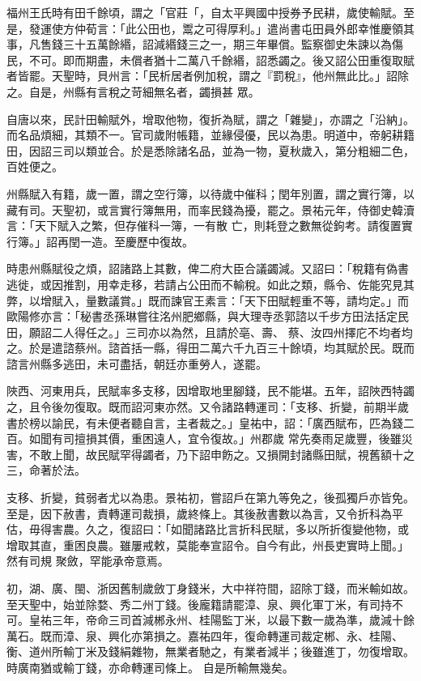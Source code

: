\begin{pinyinscope}
 福州王氏時有田千餘頃，謂之「官莊「，自太平興國中授券予民耕，歲使輸賦。至是，發運使方仲荀言：「此公田也，鬻之可得厚利。」遣尚書屯田員外郎幸惟慶領其事，凡售錢三十五萬餘緡，詔減緡錢三之一，期三年畢償。監察御史朱諫以為傷民，不可。即而期盡，未償者猶十二萬八千餘緡，詔悉蠲之。後又詔公田重復取賦者皆罷。天聖時，貝州言：「民析居者例加稅，謂之『罰稅』，他州無此比。」詔除之。自是，州縣有言稅之苛細無名者，蠲損甚
 眾。



 自唐以來，民計田輸賦外，增取他物，復折為賦，謂之「雜變」，亦謂之「沿納」。而名品煩細，其類不一。官司歲附帳籍，並緣侵優，民以為患。明道中，帝躬耕籍田，因詔三司以類並合。於是悉除諸名品，並為一物，夏秋歲入，第分粗細二色，百姓便之。



 州縣賦入有籍，歲一置，謂之空行簿，以待歲中催科；閏年別置，謂之實行簿，以藏有司。天聖初，或言實行簿無用，而率民錢為擾，罷之。景祐元年，侍御史韓瀆言：「天下賦入之繁，但存催科一簿，一有散
 亡，則耗登之數無從鉤考。請復置實行簿。」詔再閏一造。至慶歷中復故。



 時患州縣賦役之煩，詔諸路上其數，俾二府大臣合議蠲減。又詔曰：「稅籍有偽書逃徙，或因推割，用幸走移，若請占公田而不輸稅。如此之類，縣令、佐能究見其弊，以增賦入，量數議賞。」既而諫官王素言：「天下田賦輕重不等，請均定。」而歐陽修亦言：「秘書丞孫琳嘗往洺州肥鄉縣，與大理寺丞郭諮以千步方田法括定民田，願詔二人得任之。」三司亦以為然，且請於亳、壽、
 蔡、汝四州擇庀不均者均之。於是遣諮蔡州。諮首括一縣，得田二萬六千九百三十餘頃，均其賦於民。既而諮言州縣多逃田，未可盡括，朝廷亦重勞人，遂罷。



 陜西、河東用兵，民賦率多支移，因增取地里腳錢，民不能堪。五年，詔陜西特蠲之，且令後勿復取。既而詔河東亦然。又令諸路轉運司：「支移、折變，前期半歲書於榜以諭民，有未便者聽自言，主者裁之。」皇祐中，詔：「廣西賦布，匹為錢二百。如聞有司擅損其價，重困遠人，宜令復故。」州郡歲
 常先奏雨足歲豐，後雖災害，不敢上聞，故民賦罕得蠲者，乃下詔申飭之。又損開封諸縣田賦，視舊額十之三，命著於法。



 支移、折變，貧弱者尤以為患。景祐初，嘗詔戶在第九等免之，後孤獨戶亦皆免。至是，因下赦書，責轉運司裁損，歲終條上。其後赦書數以為言，又令折科為平估，毋得害農。久之，復詔曰：「如聞諸路比言折科民賦，多以所折復變他物，或增取其直，重困良農。雖屢戒敕，莫能奉宣詔令。自今有此，州長吏實時上聞。」然有司規
 聚斂，罕能承帝意焉。



 初，湖、廣、閩、浙因舊制歲斂丁身錢米，大中祥符間，詔除丁錢，而米輸如故。至天聖中，始並除婺、秀二州丁錢。後龐籍請罷漳、泉、興化軍丁米，有司持不可。皇祐三年，帝命三司首減郴永州、桂陽監丁米，以最下數一歲為準，歲減十餘萬石。既而漳、泉、興化亦第損之。嘉祐四年，復命轉運司裁定郴、永、桂陽、衡、道州所輸丁米及錢絹雜物，無業者馳之，有業者減半；後雖進丁，勿復增取。時廣南猶或輸丁錢，亦命轉運司條上。
 自是所輸無幾矣。




\end{pinyinscope}
